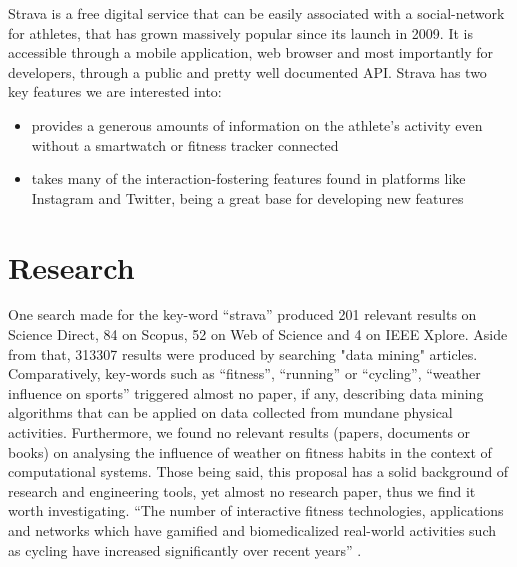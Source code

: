 Strava is a free digital service that can be easily associated with a social-network for athletes, that has grown massively popular since its launch in 2009. It is accessible through a mobile application, web browser and most importantly for developers, through a public and pretty well documented API. Strava has two key features we are interested into:
\begin{itemize}
    \item {provides a generous amounts of information on the athlete's activity even without a smartwatch or fitness tracker connected}
    \item {takes many of the interaction-fostering features found in platforms like Instagram and Twitter, being a great base for developing new features}
\end{itemize}

\section{Research}

One search made for the key-word “strava” produced 201 relevant results on Science Direct, 84 on Scopus, 52 on Web of Science and 4 on IEEE Xplore. Aside from that, 313307 results were produced by searching  "data mining" articles. Comparatively, key-words such as “fitness”, “running” or “cycling”, “weather influence on sports” triggered almost no paper, if any, describing data mining algorithms that can be applied on data collected from mundane physical activities. Furthermore, we found no relevant results (papers, documents or books) on analysing the influence of weather on fitness habits in the context of computational systems. Those being said, this proposal has a solid background of research and engineering tools, yet almost no research paper, thus we find it worth investigating. “The number of interactive fitness technologies, applications and networks which have gamified and biomedicalized real-world activities such as cycling have increased significantly over recent years” \cite{NOBAKHT2020102509}.